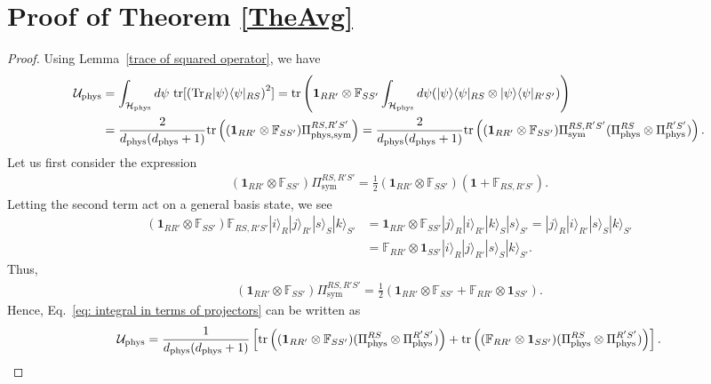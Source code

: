 \documentclass[aps,10pt,twocolumn,showpacs,pra,citeautoscript,amsmath,amssymb,floatfix,superscriptaddress]{revtex4-1}
\def\phys{{\mathrm{phys}}}
\def\sym{{\mathrm{sym}}}
\def\Tr{{\mathrm{Tr}}}
\def\tr{{\mathrm{tr}}}
\newcommand{\ch}{\mathcal H}
\newcommand{\cu}{\mathcal U}
\newcommand{\ket}[1]{|#1\rangle}
\newcommand{\ketbra}[2]{|#1\rangle\langle #2|}
\begin{document}
\section{Proof of Theorem \ref{TheAvg}} \label{app:proof3}
\begin{proof}
Using Lemma~\ref{trace of squared operator}, we have
\begin{align}
    \cu_{\rm phys} &= \int_{\ch_\phys} d\psi\ \tr[ \left( \Tr_R \ketbra{\psi}{\psi}_{RS} \right)^2] 
    = \tr\left(\mathbf{1}_{RR'} \otimes \mathbb{F}_{SS'} \int_{\ch_\phys} d\psi (\ketbra{\psi}{\psi}_{RS} \otimes \ketbra{\psi}{\psi}_{R'S'})\right) \nonumber\\ &= \frac{2}{d_{\rm phys} (d_{\rm phys} +1)} \tr \left((\mathbf{1}_{RR'} \otimes \mathbb{F}_{SS'}) \Pi_{\phys,\sym}^{RS,R'S'} \right)= \frac{2}{d_{\rm phys} (d_{\rm phys} +1)} \tr \left((\mathbf{1}_{RR'} \otimes \mathbb{F}_{SS'}) \Pi_{\sym}^{RS,R'S'} (\Pi_\phys^{RS}\otimes \Pi_\phys^{R'S'}) \right).
    \label{eq: integral in terms of projectors}
\end{align}
Let us first consider the expression
\begin{align*}
    (\mathbf{1}_{RR'} \otimes \mathbb{F}_{SS'}) \Pi_{\sym}^{RS,R'S'} = \frac{1}{2} (\mathbf{1}_{RR'} \otimes \mathbb{F}_{SS'}) (\mathbf{1} + \mathbb{F}_{RS,R'S'}) .
\end{align*}
Letting the second term act on a general basis state, we see
\begin{align*}
    (\mathbf{1}_{RR'} \otimes \mathbb{F}_{SS'})\mathbb{F}_{RS,R'S'} \ket{i}_R \ket{j}_{R'}\ket{s}_S \ket{k}_{S'} &= \mathbf{1}_{RR'} \otimes \mathbb{F}_{SS'} \ket{j}_R \ket{i}_{R'}\ket{k}_S \ket{s}_{S'} = \ket{j}_R \ket{i}_{R'}\ket{s}_S \ket{k}_{S'} \\
    &= \mathbb{F}_{RR'} \otimes \mathbf{1}_{SS'} \ket{i}_R \ket{j}_{R'}\ket{s}_S \ket{k}_{S'}.
\end{align*}
Thus,
\begin{align*}
    (\mathbf{1}_{RR'} \otimes \mathbb{F}_{SS'}) \Pi_{\sym}^{RS,R'S'} = \frac{1}{2} (\mathbf{1}_{RR'} \otimes \mathbb{F}_{SS'}+ \mathbb{F}_{RR'} \otimes \mathbf{1}_{SS'}).
\end{align*}
Hence, Eq.~\eqref{eq: integral in terms of projectors} can be written as
\begin{align*}
   \cu_{\rm phys} = \frac{1}{d_{\rm phys} (d_{\rm phys} +1)}\left[ \tr \left((\mathbf{1}_{RR'} \otimes \mathbb{F}_{SS'}) (\Pi_\phys^{RS}\otimes \Pi_\phys^{R'S'}) \right)+ \tr \left((\mathbb{F}_{RR'} \otimes \mathbf{1}_{SS'}) (\Pi_\phys^{RS}\otimes \Pi_\phys^{R'S'}) \right)\right].

\end{align*}
\end{proof}
\end{document}
